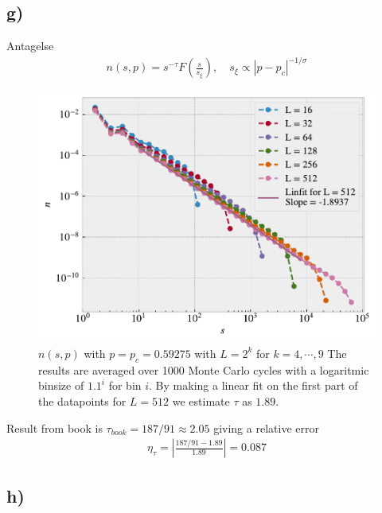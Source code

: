\documentclass[reprint, amsmath, amssymb, aps]{revtex4-2}
\begin{document}
\subsection*{g)}

Antagelse
\begin{align*}
  n(s,p) = s^{-\tau}F\left(\frac{s}{s_\xi}\right), \quad s_\xi \propto |p - p_c|^{-1/\sigma}
\end{align*}

\begin{figure}[H]
  \includegraphics[width=\linewidth]{figures/g.pdf}
  \caption{$n(s,p)$ with $p = p_c = 0.59275$ with $L = 2^k$ for $k = 4, \cdots, 9$ The results are averaged over 1000 Monte Carlo cycles with a logaritmic binsize of $1.1^i$ for bin $i$. By making a linear fit on the first part of the datapoints for $L = 512$ we estimate $\tau$ as $1.89$.}
  \label{fig:g}
\end{figure}

Result from book is $\tau_{book} = 187/91 \approx 2.05$ giving a relative error
\begin{align*}
  \eta_\tau= \left|\frac{187/91 - 1.89}{1.89}\right| = 0.087
\end{align*}


\subsection*{h)}
\end{document}
